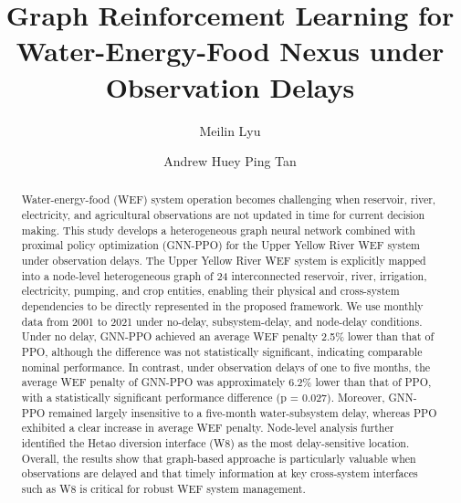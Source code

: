 \documentclass [a4paper,fleqn] {cas-dc}
\begin{document}
\let\WriteBookmarks\relax


\title[mode=title]{Graph Reinforcement Learning for Water-Energy-Food Nexus under Observation Delays}

\author[1,2]{Meilin Lyu}

\author[1]{Andrew Huey Ping Tan}
\cormark[1]




\begin{abstract}
Water-energy-food (WEF) system operation becomes challenging when reservoir, river, electricity, and agricultural observations are not updated in time for current decision making. This study develops a heterogeneous graph neural network combined with proximal policy optimization (GNN-PPO) for the Upper Yellow River WEF system under observation delays. The Upper Yellow River WEF system is explicitly mapped into a node-level heterogeneous graph of 24 interconnected reservoir, river, irrigation, electricity, pumping, and crop entities, enabling their physical and cross-system dependencies to be directly represented in the proposed framework. We use monthly data from 2001 to 2021 under no-delay, subsystem-delay, and node-delay conditions. Under no delay, GNN-PPO achieved an average WEF penalty 2.5\% lower than that of PPO, although the difference was not statistically significant, indicating comparable nominal performance. In contrast, under observation delays of one to five months, the average WEF penalty of GNN-PPO was approximately 6.2\% lower than that of PPO, with a statistically significant performance difference (p = 0.027). Moreover, GNN-PPO remained largely insensitive to a five-month water-subsystem delay, whereas PPO exhibited a clear increase in average WEF penalty. Node-level analysis further identified the Hetao diversion interface (W8) as the most delay-sensitive location. Overall, the results show that graph-based approache is  particularly valuable when observations are delayed and that timely information at key cross-system interfaces such as W8 is critical for robust WEF system management.
\end{abstract}
\end{document}
